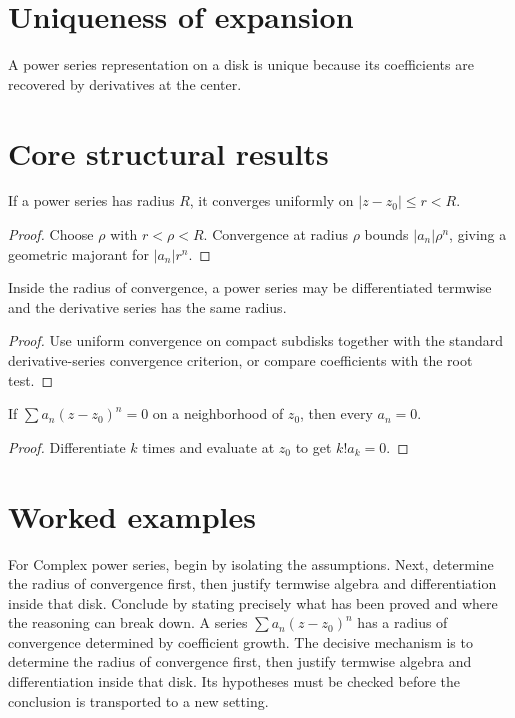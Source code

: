 \section{Uniqueness of expansion}
A power series representation on a disk is unique because its coefficients are recovered by derivatives at the center.

\section{Core structural results}

\begin{theorem}\label{thm:iv03-01}
If a power series has radius $R$, it converges uniformly on $|z-z_0|\le r<R$.
\begin{proof}
Choose $\rho$ with $r<\rho<R$. Convergence at radius $\rho$ bounds $|a_n|\rho^n$, giving a geometric majorant for $|a_n|r^n$.
\end{proof}
\end{theorem}

\begin{theorem}\label{thm:iv03-02}
Inside the radius of convergence, a power series may be differentiated termwise and the derivative series has the same radius.
\begin{proof}
Use uniform convergence on compact subdisks together with the standard derivative-series convergence criterion, or compare coefficients with the root test.
\end{proof}
\end{theorem}

\begin{theorem}\label{thm:iv03-03}
If $\sum a_n(z-z_0)^n=0$ on a neighborhood of $z_0$, then every $a_n=0$.
\begin{proof}
Differentiate $k$ times and evaluate at $z_0$ to get $k!a_k=0$.
\end{proof}
\end{theorem}

\section{Worked examples}

\begin{example}\label{ex:iv03-worked-01}
For Complex power series, begin by isolating the assumptions. Next, determine the radius of convergence first, then justify termwise algebra and differentiation inside that disk. Conclude by stating precisely what has been proved and where the reasoning can break down. A series $\sum a_n(z-z_0)^n$ has a radius of convergence determined by coefficient growth. The decisive mechanism is to determine the radius of convergence first, then justify termwise algebra and differentiation inside that disk. Its hypotheses must be checked before the conclusion is transported to a new setting.
\end{example}

